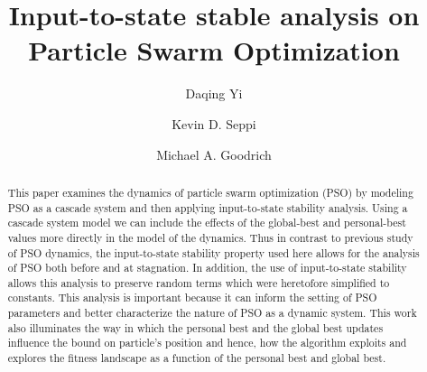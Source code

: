 \documentclass{llncs}
\begin{document}
\title{Input-to-state stable analysis on Particle Swarm Optimization}




\author{Daqing Yi \and Kevin D. Seppi \and Michael A. Goodrich}





\maketitle

\begin{abstract}
This paper examines the dynamics of particle swarm optimization (PSO) by modeling PSO as a cascade system and then applying input-to-state stability analysis.
Using a cascade system model we can
include the effects of the global-best and personal-best values more directly in the model of the dynamics.
Thus in contrast to previous study of PSO dynamics, the input-to-state stability property used here allows for the analysis of PSO both before and at stagnation.
In addition, the use of input-to-state stability allows this analysis to preserve random terms which were heretofore simplified to constants.
This analysis is important because it can inform the setting of PSO parameters and better characterize the nature of PSO as a dynamic system.
This work also illuminates the way in which the personal best and the global best updates influence the bound on particle's position and hence, how the algorithm
exploits and explores the fitness landscape as a function of the personal best and global best.
\end{abstract}
\end{document}
